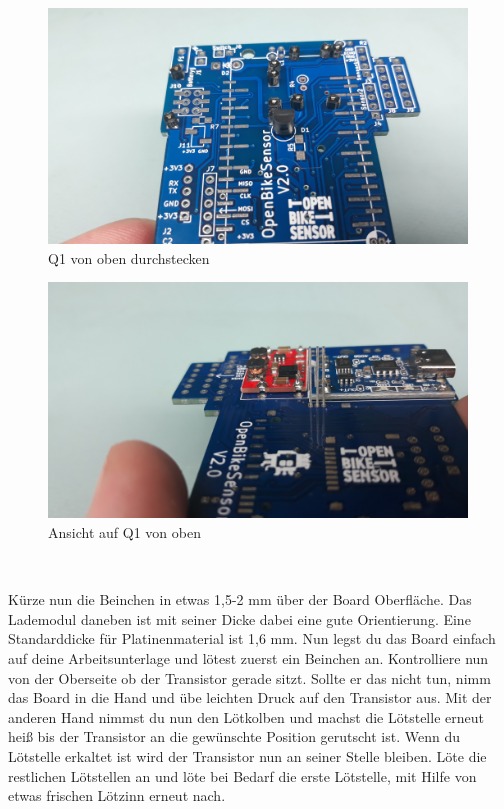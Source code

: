 \documentclass[12pt, a4paper]{article}		%
\begin{document}
\begin{minipage}[t]{0.49\textwidth}
\begin{figure}[H]
	\centering
		\includegraphics[width=0.99\textwidth]{Grafiken/20200726_124649.jpg}
	\caption{Q1 von oben durchstecken}
	\label{fig:20200726_124649}
\end{figure}
\end{minipage}
\begin{minipage}[t]{0.49\textwidth}
\begin{figure}[H]
	\centering
		\includegraphics[width=0.99\textwidth]{Grafiken/20200726_124658.jpg}
	\caption{Ansicht auf Q1 von oben}
	\label{fig:}
\end{figure}
\end{minipage}
\\ \newline

Kürze nun die Beinchen in etwas 1,5-2 mm über der Board Oberfläche. Das Lademodul daneben ist mit seiner Dicke dabei eine gute Orientierung. Eine Standarddicke für Platinenmaterial ist 1,6 mm. Nun legst du das Board einfach auf deine Arbeitsunterlage und lötest zuerst ein Beinchen an. Kontrolliere nun von der Oberseite ob der Transistor gerade sitzt. Sollte er das nicht tun, nimm das Board in die Hand und übe leichten Druck auf den Transistor aus. Mit der anderen Hand nimmst du nun den Lötkolben und machst die Lötstelle erneut heiß bis der Transistor an die gewünschte Position gerutscht ist. Wenn du Lötstelle erkaltet ist wird der Transistor nun an seiner Stelle bleiben. Löte die restlichen Lötstellen an und löte bei Bedarf die erste Lötstelle, mit Hilfe von etwas frischen Lötzinn erneut nach.
\end{document}
